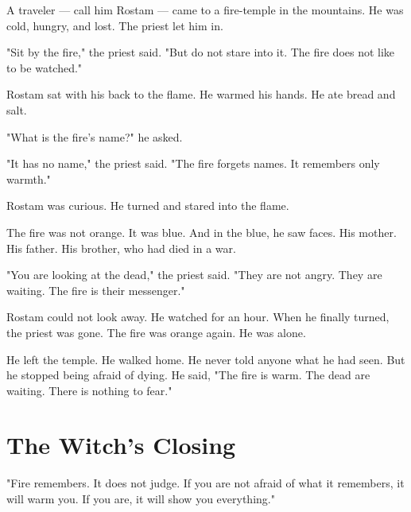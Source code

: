 \documentclass[10pt,twoside]{book}
\begin{document}
A traveler --- call him Rostam --- came to a fire-temple in the mountains. He was cold, hungry, and lost. The priest let him in.

"Sit by the fire," the priest said. "But do not stare into it. The fire does not like to be watched."

Rostam sat with his back to the flame. He warmed his hands. He ate bread and salt.

"What is the fire's name?" he asked.

"It has no name," the priest said. "The fire forgets names. It remembers only warmth."

Rostam was curious. He turned and stared into the flame.

The fire was not orange. It was blue. And in the blue, he saw faces. His mother. His father. His brother, who had died in a war.

"You are looking at the dead," the priest said. "They are not angry. They are waiting. The fire is their messenger."

Rostam could not look away. He watched for an hour. When he finally turned, the priest was gone. The fire was orange again. He was alone.

He left the temple. He walked home. He never told anyone what he had seen. But he stopped being afraid of dying. He said, "The fire is warm. The dead are waiting. There is nothing to fear."

\section*{The Witch's Closing}
"Fire remembers. It does not judge. If you are not afraid of what it remembers, it will warm you. If you are, it will show you everything."
\end{document}
